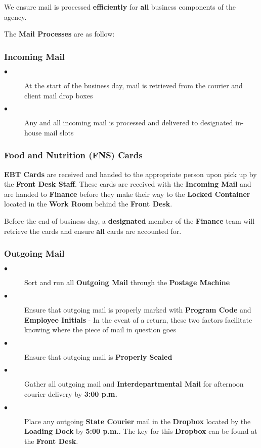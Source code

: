 \documentclass{article}
\begin{document}
We ensure mail is processed \textbf{efficiently} for \textbf{all} business components of the agency. 

The \textbf{Mail Processes} are as follow:

\subsubsection{Incoming Mail}
\begin{description}
    \item[$\bullet$] At the start of the business day, mail is retrieved from the courier and client mail drop boxes
    \item[$\bullet$] Any and all incoming mail is processed and delivered to designated in-house mail slots
\end{description}

\subsubsection{Food and Nutrition (FNS) Cards}
\textbf{EBT Cards} are received and handed to the appropriate person upon pick up by the \textbf{Front Desk Staff}. These cards are received with the \textbf{Incoming Mail} and are handed to \textbf{Finance} before they make their way to the \textbf{Locked Container} located in the \textbf{Work Room} behind the \textbf{Front Desk}. 

Before the end of business day, a \textbf{designated} member of the \textbf{Finance} team will retrieve the cards and ensure \textbf{all} cards are accounted for.

\subsubsection{Outgoing Mail}
\begin{description}
    \item[$\bullet$] Sort and run all \textbf{Outgoing Mail} through the \textbf{Postage Machine}
    \item[$\bullet$] Ensure that outgoing mail is properly marked with \textbf{Program Code} and \textbf{Employee Initials} - In the event of a return, these two factors facilitate knowing where the piece of mail in question goes
    \item[$\bullet$] Ensure that outgoing mail is \textbf{Properly Sealed}
    \item[$\bullet$] Gather all outgoing mail and \textbf{Interdepartmental Mail} for afternoon courier delivery by \textbf{3:00 p.m.}
    \item[$\bullet$] Place any outgoing \textbf{State Courier} mail in the \textbf{Dropbox} located by the \textbf{Loading Dock} by \textbf{5:00 p.m.}. The key for this \textbf{Dropbox} can be found at the \textbf{Front Desk}.
\end{description}
\end{document}
